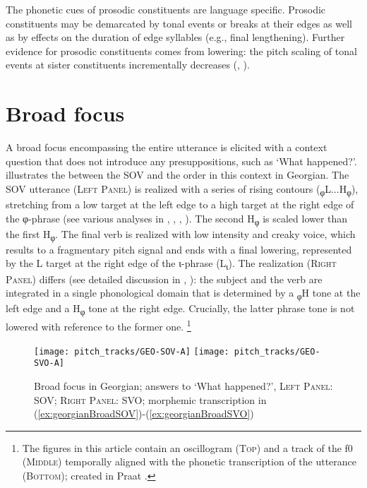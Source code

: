\documentclass[output=paper,colorlinks,citecolor=brown]{langscibook}
\begin{document}
The phonetic cues of prosodic constituents are language specific. Prosodic constituents may be demarcated by tonal events or breaks at their edges as well as by effects on the duration of edge syllables (e.g., final lengthening). Further evidence for prosodic constituents comes from  lowering: the pitch scaling of tonal events at sister constituents incrementally decreases (\citealt[]{ladd_declination_1988}, \citealt[]{fery_focus_2013}). 

\section{Broad focus} \label{sec:broad}

A broad focus encompassing the entire utterance is elicited with a context question that does not introduce any presuppositions, such as ‘What happened?’.  illustrates the  between the SOV and the  order in this context in Georgian. The SOV utterance (\textsc{Left Panel}) is realized with a series of rising contours (\textsubscript{φ}L...H\textsubscript{φ}), stretching from a low target at the left edge to a high target at the right edge of the φ-phrase (see various analyses in \citealt[]{skopeteas_word_2009}, \citealt[]{vicenik_autosegmental-metrical_2014}, \citealt[]{Skopeteasetal_Information_2018}, \citealt[]{borise_focus_2021}). The second H\textsubscript{φ} is scaled lower than the first H\textsubscript{φ}. The final verb is realized with low intensity and creaky voice, which results to a fragmentary pitch signal and ends with a final lowering, represented by the L target at the right edge of the ι-phrase (L\textsubscript{ι}). The  realization (\textsc{Right Panel}) differs (see detailed discussion in \citealt[]{skopeteas_Fery_focus_2010}, \citealt[]{Skopeteasetal_Information_2018}): the subject and the verb are integrated in a single phonological domain that is determined by a \textsubscript{φ}H tone at the left edge and a H\textsubscript{φ} tone at the right edge. Crucially, the latter phrase tone is not lowered with reference to the former one. \footnote{The figures in this article contain an oscillogram (\textsc{Top}) and a track of the f\textsc{0} (\textsc{Middle}) temporally aligned with the phonetic transcription of the utterance (\textsc{Bottom}); created in Praat \citep{boersma_praat_2023}.}

\begin{figure}
    \texttt{[image: pitch\_tracks/GEO-SOV-A]}
    \texttt{[image: pitch\_tracks/GEO-SVO-A]}
    \caption{Broad focus in Georgian; answers to ‘What happened?’, \textsc{Left Panel}: SOV; \textsc{Right Panel}: SVO; morphemic transcription in (\ref{ex:georgianBroadSOV})-(\ref{ex:georgianBroadSVO})}
    \label{fig:georgianBroad}
\end{figure}
\end{document}
